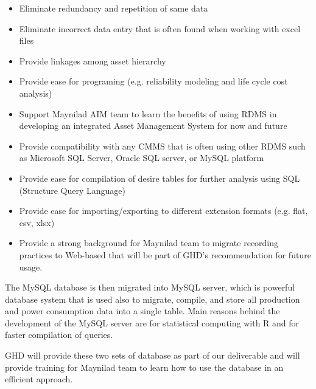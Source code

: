\begin{itemize}
\item Eliminate redundancy and repetition of same data
\item Eliminate incorrect data entry that is often found when working with excel files
\item Provide linkages among asset hierarchy
\item Provide ease for programing (e.g. reliability modeling and life cycle cost analysis)
\item Support Maynilad AIM team to learn the benefits of using RDMS in developing an integrated Asset Management System for now and future
\item Provide compatibility with any CMMS that is often using other RDMS such as Microsoft SQL Server, Oracle SQL server, or MySQL platform
\item Provide ease for compilation of desire tables for further analysis using SQL (Structure Query Language)
\item Provide ease for importing/exporting to different extension formats (e.g. flat, csv, xlsx)
\item Provide a strong background for Maynilad team to migrate recording practices to Web-based that will be part of GHD's recommendation for future usage.
\end{itemize}

The MySQL database is then migrated into MySQL server, which is powerful database system that is used also to migrate, compile, and store all production and power consumption data into a single table. Main reasons behind the development of the MySQL server are for statistical computing with R and for faster compilation of queries.

GHD will provide these two sets of database as part of our deliverable and will provide training for Maynilad team to learn how to use the database in an efficient approach.




